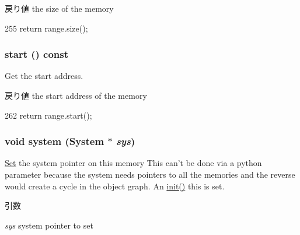 \begin{DoxyReturn}{戻り値}
the size of the memory 
\end{DoxyReturn}



\begin{DoxyCode}
255 { return range.size(); }
\end{DoxyCode}
\hypertarget{classAbstractMemory_a85325674b7aed05d6b4e40a48563189b}{
\subsubsection[{start}]{ start () const}}
\label{classAbstractMemory_a85325674b7aed05d6b4e40a48563189b}
Get the start address.

\begin{DoxyReturn}{戻り値}
the start address of the memory 
\end{DoxyReturn}



\begin{DoxyCode}
262 { return range.start(); }
\end{DoxyCode}
\hypertarget{classAbstractMemory_ad086bdc3ed123ad02169847d658bf5cb}{
\subsubsection[{system}]{\setlength{\rightskip}{0pt plus 5cm}void system ({\bf System} $\ast$ {\em sys})}}
\label{classAbstractMemory_ad086bdc3ed123ad02169847d658bf5cb}
\hyperlink{classSet}{Set} the system pointer on this memory This can't be done via a python parameter because the system needs pointers to all the memories and the reverse would create a cycle in the object graph. An \hyperlink{classSimObject_a02fd73d861ef2e4aabb38c0c9ff82947}{init()} this is set. 
\begin{DoxyParams}{引数}
\item[{\em sys}]system pointer to set \end{DoxyParams}



